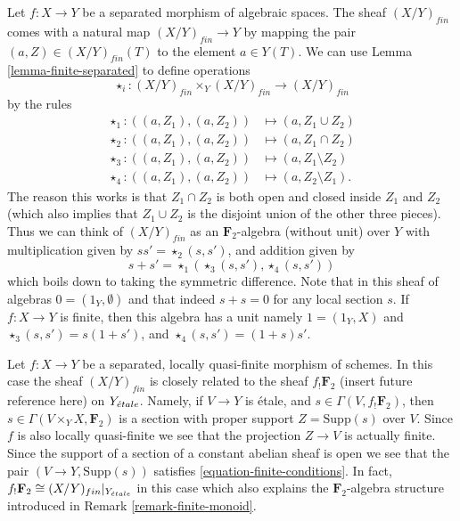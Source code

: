 \begin{remark}
\label{remark-finite-monoid}
Let $f : X \to Y$ be a separated morphism of algebraic spaces.
The sheaf $(X/Y)_{fin}$ comes with a natural map
$(X/Y)_{fin} \to Y$ by mapping the pair $(a, Z) \in (X/Y)_{fin}(T)$
to the element $a \in Y(T)$. We can use
Lemma \ref{lemma-finite-separated}
to define operations
$$
\star_i : (X/Y)_{fin} \times_Y (X/Y)_{fin} \longrightarrow (X/Y)_{fin}
$$
by the rules
\begin{align*}
\star_1 : ((a, Z_1), (a, Z_2)) & \longmapsto (a, Z_1 \cup Z_2) \\
\star_2 : ((a, Z_1), (a, Z_2)) & \longmapsto (a, Z_1 \cap Z_2) \\
\star_3 : ((a, Z_1), (a, Z_2)) & \longmapsto (a, Z_1 \setminus Z_2) \\
\star_4 : ((a, Z_1), (a, Z_2)) & \longmapsto (a, Z_2 \setminus Z_1).
\end{align*}
The reason this works is that $Z_1 \cap Z_2$ is both open and closed
inside $Z_1$ and $Z_2$ (which also implies that $Z_1 \cup Z_2$ is
the disjoint union of the other three pieces).
Thus we can think of $(X/Y)_{fin}$ as an $\mathbf{F}_2$-algebra
(without unit) over $Y$ with multiplication given by
$ss' = \star_2(s, s')$, and addition given by
$$
s + s' = \star_1(\star_3(s, s'), \star_4(s, s'))
$$
which boils down to taking the symmetric difference.
Note that in this sheaf of algebras $0 = (1_Y, \emptyset)$
and that indeed $s + s = 0$ for any local section $s$.
If $f : X \to Y$ is finite, then this algebra has a unit namely
$1 = (1_Y, X)$ and $\star_3(s, s') = s(1 + s')$, and
$\star_4(s, s') = (1 + s)s'$.
\end{remark}

\begin{remark}
\label{remark-finite-quasi-finite-separated-morphism-schemes}
Let $f : X \to Y$ be a separated, locally quasi-finite
morphism of schemes. In this case the sheaf $(X/Y)_{fin}$
is closely related to the sheaf $f_!\mathbf{F}_2$
(insert future reference here) on $Y_{\acute{e}tale}$.
Namely, if $V \to Y$ is \'etale, and $s \in \Gamma(V, f_!\mathbf{F}_2)$,
then $s \in \Gamma(V \times_Y X, \mathbf{F}_2)$ is a section
with proper support $Z = \text{Supp}(s)$ over $V$. Since $f$ is
also locally quasi-finite we see that the projection $Z \to V$ is actually
finite. Since the support of a section of a constant abelian sheaf is open
we see that the pair $(V \to Y, \text{Supp}(s))$ satisfies
\ref{equation-finite-conditions}.
In fact, $f_!\mathbf{F}_2 \cong (X/Y)_{fin}|_{Y_{\acute{e}tale}}$
in this case which also explains the $\mathbf{F}_2$-algebra structure
introduced in Remark \ref{remark-finite-monoid}.
\end{remark}

